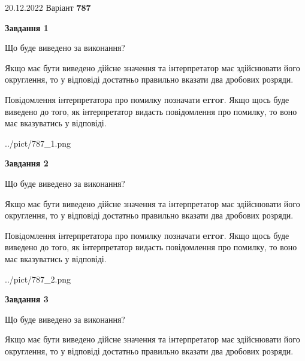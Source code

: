 \documentclass[12pt, ukrainian]{article}
\begin{document}
{20.12.2022 Варіант \No \textbf { 787 }\par}
{
\begin {Large}

{\begin {center}\textbf{Завдання 1}\end {center}}\par
Що буде виведено за виконання? \par

Якщо має бути виведено дійсне значення та інтерпретатор має здійснювати його округлення, 
то у відповіді достатньо правильно вказати два дробових розряди.

Повідомлення інтерпретатора про помилку позначати \textbf{error}.
Якщо щось буде виведено до того, як інтерпретатор видасть повідомлення про помилку, 
то воно має вказуватись у відповіді. \par

\begin{center}
	{../pict/787_1.png}
\end{center}
\newpage

{\begin {center}\textbf{Завдання 2}\end {center}}\par
Що буде виведено за виконання? \par

Якщо має бути виведено дійсне значення та інтерпретатор має здійснювати його округлення, 
то у відповіді достатньо правильно вказати два дробових розряди.

Повідомлення інтерпретатора про помилку позначати \textbf{error}.
Якщо щось буде виведено до того, як інтерпретатор видасть повідомлення про помилку, 
то воно має вказуватись у відповіді. \par

\begin{center}
	{../pict/787_2.png}
\end{center}
\newpage

{\begin {center}\textbf{Завдання 3}\end {center}}\par
Що буде виведено за виконання? \par

Якщо має бути виведено дійсне значення та інтерпретатор має здійснювати його округлення, 
то у відповіді достатньо правильно вказати два дробових розряди.


\end{Large}}
\end{document}

